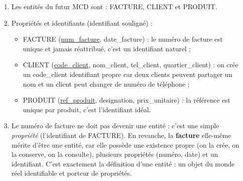 \documentclass[11pt]{article}
\newcommand{\cle}[1]{{\popxbold\color{popdark}#1}}
\begin{document}
\begin{corrige}
\begin{enumerate}
\item Les entités du futur MCD sont : \cle{FACTURE}, \cle{CLIENT} et \cle{PRODUIT}.
\item Propriétés et identifiants (identifiant souligné) :
\begin{itemize}
\item FACTURE (\underline{num\_facture}, date\_facture) : le numéro de facture est unique et jamais réattribué, c'est un identifiant naturel ;
\item CLIENT (\underline{code\_client}, nom\_client, tel\_client, quartier\_client) : on crée un \cle{code\_client} identifiant propre car deux clients peuvent partager un nom et un client peut changer de numéro de téléphone ;
\item PRODUIT (\underline{ref\_produit}, designation, prix\_unitaire) : la référence est unique par produit, c'est l'identifiant idéal.
\end{itemize}
\item Le numéro de facture ne doit pas devenir une entité : c'est une simple \emph{propriété} (l'identifiant de FACTURE). En revanche, la \textbf{facture} elle-même mérite d'être une entité, car elle possède une existence propre (on la crée, on la conserve, on la consulte), plusieurs propriétés (numéro, date) et un identifiant. C'est exactement la définition d'une entité : un objet du monde réel identifiable et porteur de propriétés.
\end{enumerate}
\end{corrige}
\end{document}

